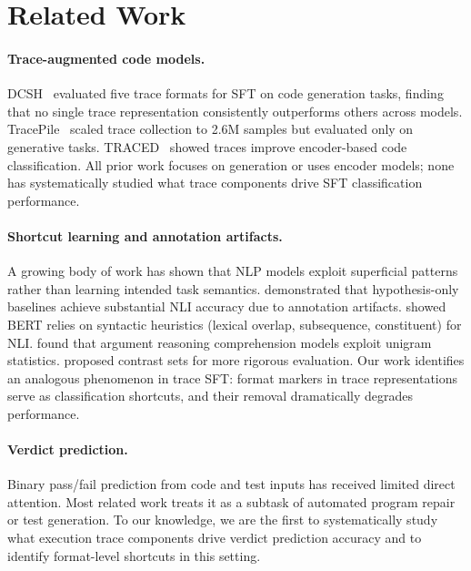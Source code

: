 \documentclass[11pt,a4paper]{article}
\begin{document}
\section{Related Work}
\label{sec:related}

\paragraph{Trace-augmented code models.}
DCSH~\cite{gu2024execution} evaluated five trace formats for SFT on code generation tasks, finding that no single trace representation consistently outperforms others across models.
TracePile~\cite{wang2025tracepile} scaled trace collection to 2.6M samples but evaluated only on generative tasks.
TRACED~\cite{chen2024traced} showed traces improve encoder-based code classification.
All prior work focuses on generation or uses encoder models; none has systematically studied what trace components drive SFT classification performance.

\paragraph{Shortcut learning and annotation artifacts.}
A growing body of work has shown that NLP models exploit superficial patterns rather than learning intended task semantics.
\citet{gururangan2018annotation} demonstrated that hypothesis-only baselines achieve substantial NLI accuracy due to annotation artifacts.
\citet{mccoy2019right} showed BERT relies on syntactic heuristics (lexical overlap, subsequence, constituent) for NLI.
\citet{niven2019probing} found that argument reasoning comprehension models exploit unigram statistics.
\citet{gardner2021competency} proposed contrast sets for more rigorous evaluation.
Our work identifies an analogous phenomenon in trace SFT: format markers in trace representations serve as classification shortcuts, and their removal dramatically degrades performance.

\paragraph{Verdict prediction.}
Binary pass/fail prediction from code and test inputs has received limited direct attention.
Most related work treats it as a subtask of automated program repair or test generation.
To our knowledge, we are the first to systematically study what execution trace components drive verdict prediction accuracy and to identify format-level shortcuts in this setting.
\end{document}
